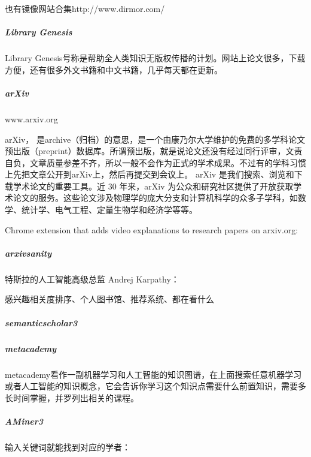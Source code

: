 \documentclass[letterpaper,10pt,english]{sphinxmanual}
\begin{document}
也有镜像网站合集http://www.dirmor.com/


\subparagraph{Library Genesis}
\label{\detokenize{chapter_knowledge/research:library-genesis}}
Library
Genesis号称是帮助全人类知识无版权传播的计划。网站上论文很多，下载方便，还有很多外文书籍和中文书籍，几乎每天都在更新。


\subparagraph{arXiv}
\label{\detokenize{chapter_knowledge/research:arxiv}}
www.arxiv.org

arXiv，
是archive（归档）的意思，是一个由康乃尔大学维护的免费的多学科论文预出版（preprint）数据库。所谓预出版，就是说论文还没有经过同行评审，文责自负，文章质量参差不齐，所以一般不会作为正式的学术成果。不过有的学科习惯上先把文章公开到arXiv上，然后再提交到会议上。
arXiv 是我们搜索、浏览和下载学术论文的重要工具。近 30 年来，arXiv
为公众和研究社区提供了开放获取学术论文的服务。这些论文涉及物理学的庞大分支和计算机科学的众多子学科，如数学、统计学、电气工程、定量生物学和经济学等等。

Chrome extension that adds video explanations to research papers on
arxiv.org: 


\subparagraph{arxiv\sphinxhyphen{}sanity}
\label{\detokenize{chapter_knowledge/research:arxiv-sanity}}
特斯拉的人工智能高级总监 Andrej Karpathy：

感兴趣相关度排序、个人图书馆、推荐系统、都在看什么%
\begin{footnote}[682]\sphinxAtStartFootnote
{}
%
\end{footnote}



\subparagraph{semanticscholar3}
\label{\detokenize{chapter_knowledge/research:semanticscholar3}}


\subparagraph{metacademy}
\label{\detokenize{chapter_knowledge/research:metacademy}}

metacademy看作一副机器学习和人工智能的知识图谱，在上面搜索任意机器学习或者人工智能的知识概念，它会告诉你学习这个知识点需要什么前置知识，需要多长时间掌握，并罗列出相关的课程。


\subparagraph{AMiner3}
\label{\detokenize{chapter_knowledge/research:aminer3}}
输入关键词就能找到对应的学者： 
\end{document}
